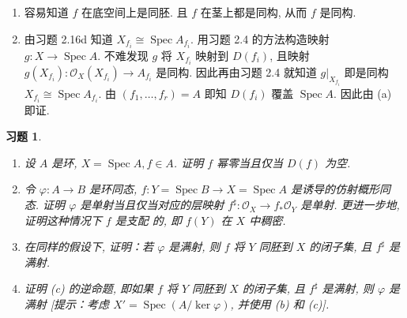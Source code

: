 \documentclass{article}
\theoremstyle{exercise}
\newtheorem{exercise}{习题}[section]
\newenvironment{proofc}{\proof}{\endproof}
\def\sO{\mathscr{O}}
\def\Spec{\operatorname{Spec}}
\begin{document}
\begin{proofc}
  \begin{enumerate}[label={(\alph*)}]
    \item 容易知道 $f$ 在底空间上是同胚. 且 $f$ 在茎上都是同构, 从而 $f$ 是同构.

    \item 由习题 2.16d 知道 $X_{f_i} \cong \Spec A_{f_i}$.
          用习题 2.4 的方法构造映射 $g \colon X \to \Spec A$.
          不难发现 $g$ 将 $X_{f_i}$ 映射到 $D(f_i)$,
          且映射 $g(X_{f_i}) \colon \sO_X(X_{f_i}) \to A_{f_i}$ 是同构.
          因此再由习题 2.4 就知道 $g|_{X_{f_i}}$ 即是同构 $X_{f_i} \cong \Spec A_{f_i}$.
          由 $(f_1, \dots, f_r) = A$ 即知 $D(f_i)$ 覆盖 $\Spec A$. 因此由 (a) 即证.
          \qedhere
  \end{enumerate}
\end{proofc}

\begin{exercise}
  \begin{enumerate}[label={(\alph*)}]
          本习题中, 我们将比较环同态的若干性质和其诱导的谱的同态的性质.
    \item 设 $A$ 是环, $X = \Spec A, f \in A$. 证明 $f$ 幂零当且仅当 $D(f)$ 为空.
    \item 令 $\varphi \colon A \to B$ 是环同态, $f \colon Y = \Spec B \to X = \Spec A$
          是诱导的仿射概形同态.
          证明 $\varphi$ 是单射当且仅当对应的层映射 $f^\sharp \colon \sO_X \to f_* \sO_Y$ 是单射.
          更进一步地, 证明这种情况下 $f$ 是\emph{支配} 的, 即 $f(Y)$ 在 $X$ 中稠密.
    \item 在同样的假设下, 证明：若 $\varphi$ 是满射, 则 $f$ 将 $Y$ 同胚到 $X$ 的闭子集,
          且 $f^\sharp$ 是满射.
    \item 证明 (c) 的逆命题, 即如果 $f$ 将 $Y$ 同胚到 $X$ 的闭子集,
          且 $f^\sharp$ 是满射, 则 $\varphi$ 是满射
          [提示：考虑 $X' = \Spec(A / \ker \varphi)$, 并使用 (b) 和 (c)].
  \end{enumerate}
\end{exercise}
\end{document}
